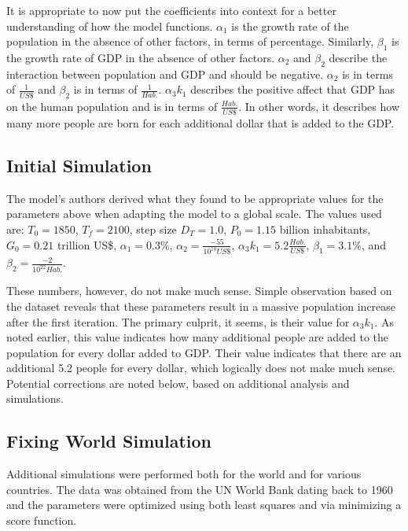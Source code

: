 \documentclass[a4paper]{article}
\begin{document}
It is appropriate to now put the coefficients into context for a better understanding of how the model functions. $\alpha_1$ is the growth rate of the population in the absence of other factors, in terms of percentage. Similarly, $\beta_1$ is the growth rate of GDP in the absence of other factors. $\alpha_2$ and $\beta_2$ describe the interaction between population and GDP and should be negative. $\alpha_2$ is in terms of $\frac{1}{US\$}$ and $\beta_2$ is in terms of $\frac{1}{Hab.}$. $\alpha_3 k_1$ describes the positive affect that GDP has on the human population and is in terms of $\frac{Hab.}{US\$}$. In other words, it describes how many more people are born for each additional dollar that is added to the GDP. 

\subsection{Initial Simulation}

The model's authors derived what they found to be appropriate values for the parameters above when adapting the model to a global scale. The values used are: $T_0 = 1850$, $T_f = 2100$, step size $D_T = 1.0$, $P_0 = 1.15$ billion inhabitants, $G_0 = 0.21$ trillion US\$, $\alpha_1 = 0.3\%$, $\alpha_2 = \frac{-55}{10^{18} US\$}$, $\alpha_3 k_1 = 5.2 \frac{Hab.}{US \$}$, $\beta_1 = 3.1\%$, and $\beta_2 = \frac{-2}{10^{22} Hab.}$. 

These numbers, however, do not make much sense. Simple observation based on the dataset reveals that these parameters result in a massive population increase after the first iteration. The primary culprit, it seems, is their value for $\alpha_3 k_1$. As noted earlier, this value indicates how many additional people are added to the population for every dollar added to GDP. Their value indicates that there are an additional 5.2 people for every dollar, which logically does not make much sense. Potential corrections are noted below, based on additional analysis and simulations.

\subsection{Fixing World Simulation}

Additional simulations were performed both for the world and for various countries. The data was obtained from the UN World Bank dating back to 1960 and the parameters were optimized using both least squares and via minimizing a score function.
\end{document}
